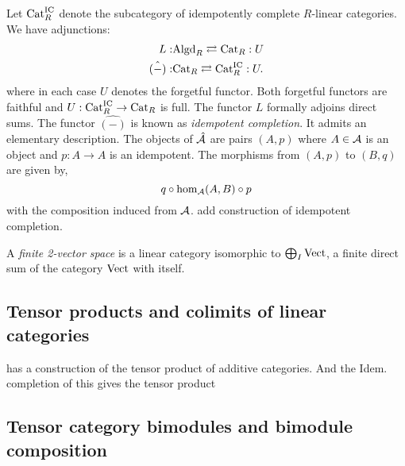 \documentclass{amsart}
\begin{document}
Let $\mathrm{Cat}_R^\text{IC}$ denote the subcategory of idempotently complete $R$-linear categories. We have adjunctions:
\begin{align*}
		L:  & \mathrm{Algd}_R   \rightleftarrows \mathrm{Cat}_R : U \\
		\hat{(-)}:  & \mathrm{Cat}_R \rightleftarrows \mathrm{Cat}_R^\textrm{IC} : U. 
\end{align*}
where in each case $U$ denotes the forgetful functor. Both forgetful functors are faithful and $U: \mathrm{Cat}_R^\textrm{IC} \to \mathrm{Cat}_R$ is full. The functor $L$ formally adjoins direct sums. The functor $\hat{(-)}$ is known as {\em idempotent completion}. It admits an elementary description. The objects of $\hat {\mathcal A}$ are pairs $(A, p)$ where $A \in \mathcal A$ is an object and $p: A \to A$ is an idempotent. The morphisms from $(A, p)$ to $(B,q)$ are given by,
\begin{equation*}
	q \circ \hom_\mathcal A(A, B) \circ p
\end{equation*} 
with the composition induced from $\mathcal A$.
add construction of idempotent completion. 



\begin{definition}
	A {\em finite 2-vector space} is a linear category isomorphic to $\bigoplus_I \mathrm{Vect}$,
	 a finite direct sum of the category $\mathrm{Vect}$ with itself. 
\end{definition}

\subsection{Tensor products and colimits of linear categories}

{\color{CSPcolor}
\cite{Tambara01} has a construction of the tensor product of additive categories. And the Idem. completion of this gives the tensor product 

}
\subsection{Tensor category bimodules and bimodule composition}
\end{document}
